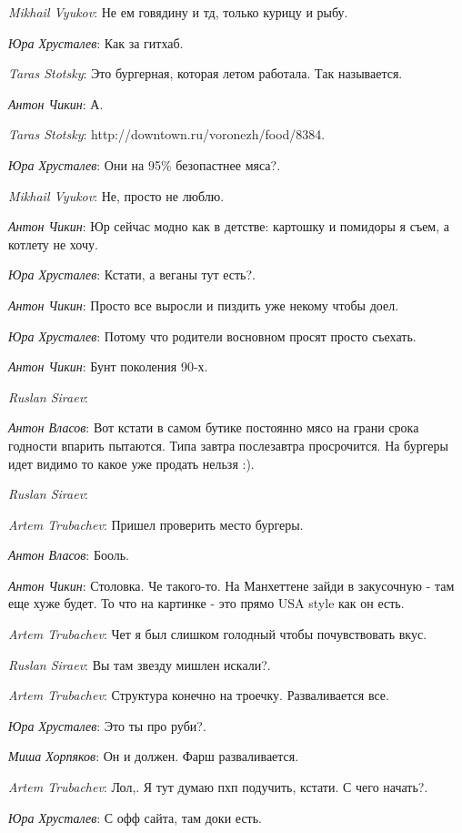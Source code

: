 \documentclass[10pt]{book}
\newcommand{\AUTHOR}[1]{\emph{#1}:}
\begin{document}
\AUTHOR{Mikhail Vyukov} Не ем говядину и тд, только курицу и рыбу.

\AUTHOR{Юра Хрусталев} Как за гитхаб.

\AUTHOR{Taras Stotsky} Это бургерная, которая летом работала. Так называется.

\AUTHOR{Антон Чикин} А.

\AUTHOR{Taras Stotsky} http://downtown.ru/voronezh/food/8384.

\AUTHOR{Юра Хрусталев} Они на 95\% безопастнее мяса?.

\AUTHOR{Mikhail Vyukov} Не, просто не люблю.

\AUTHOR{Антон Чикин} Юр сейчас модно как в детстве: картошку и помидоры я съем, а котлету не хочу.

\AUTHOR{Юра Хрусталев} Кстати, а веганы тут есть?.

\AUTHOR{Антон Чикин} Просто все выросли и пиздить уже некому чтобы доел.

\AUTHOR{Юра Хрусталев} Потому что родители восновном просят просто съехать.

\AUTHOR{Антон Чикин} Бунт поколения 90-х.

\AUTHOR{Ruslan Siraev}

\AUTHOR{Антон Власов} Вот кстати в самом бутике постоянно мясо на грани срока годности впарить пытаются. Типа завтра послезавтра просрочится. На бургеры идет видимо то какое уже продать нельзя :).

\AUTHOR{Ruslan Siraev}

\AUTHOR{Artem Trubachev} Пришел проверить место бургеры.

\AUTHOR{Антон Власов} Бооль.

\AUTHOR{Антон Чикин} Столовка. Че такого-то. На Манхеттене зайди в закусочную - там еще хуже будет. То что на картинке - это прямо USA style как он есть.

\AUTHOR{Artem Trubachev} Чет я был слишком голодный чтобы почувствовать вкус.

\AUTHOR{Ruslan Siraev} Вы там звезду мишлен искали?.

\AUTHOR{Artem Trubachev} Структура конечно на троечку. Разваливается все.

\AUTHOR{Юра Хрусталев} Это ты про руби?.

\AUTHOR{Миша Хорпяков} Он и должен. Фарш разваливается.

\AUTHOR{Artem Trubachev} Лол,. Я тут думаю пхп подучить, кстати. С чего начать?.

\AUTHOR{Юра Хрусталев} С офф сайта, там доки есть.
\end{document}
